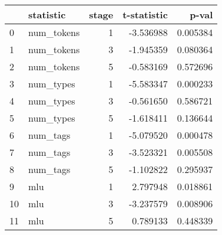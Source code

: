 \begin{tabular}{llrrr}
\toprule
{} &   statistic &  stage &  t-statistic &     p-val \\
\midrule
0  &  num\_tokens &      1 &    -3.536988 &  0.005384 \\
1  &  num\_tokens &      3 &    -1.945359 &  0.080364 \\
2  &  num\_tokens &      5 &    -0.583169 &  0.572696 \\
3  &   num\_types &      1 &    -5.583347 &  0.000233 \\
4  &   num\_types &      3 &    -0.561650 &  0.586721 \\
5  &   num\_types &      5 &    -1.618411 &  0.136644 \\
6  &    num\_tags &      1 &    -5.079520 &  0.000478 \\
7  &    num\_tags &      3 &    -3.523321 &  0.005508 \\
8  &    num\_tags &      5 &    -1.102822 &  0.295937 \\
9  &         mlu &      1 &     2.797948 &  0.018861 \\
10 &         mlu &      3 &    -3.237579 &  0.008906 \\
11 &         mlu &      5 &     0.789133 &  0.448339 \\
\bottomrule
\end{tabular}
